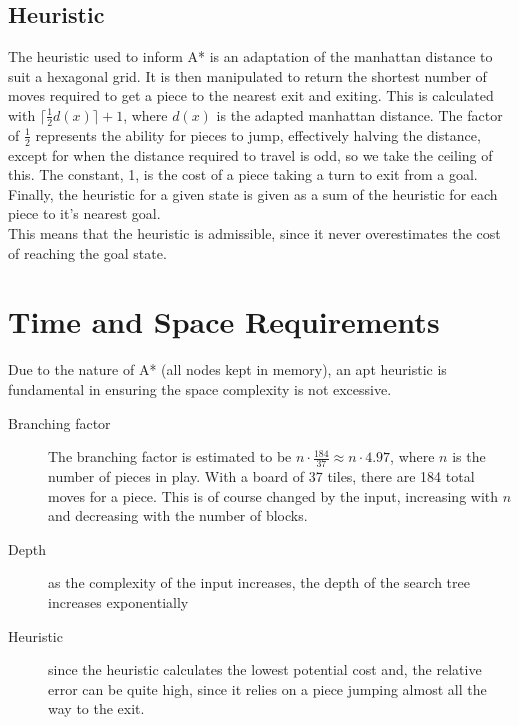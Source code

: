 \documentclass[a4paper,10pt,draft]{article}
\begin{document}
\subsection{Heuristic}
The heuristic used to inform A* is an adaptation of the manhattan distance to suit a hexagonal grid.
It is then manipulated to return the shortest number of moves required to get a piece to the nearest exit and exiting.
This is calculated with $\lceil\frac{1}{2}d(x)\rceil + 1$, where $d(x)$ is the adapted manhattan distance.
The factor of $\frac{1}{2}$ represents the ability for pieces to jump, effectively halving the distance, except for when the distance required to travel is odd, so we take the ceiling of this.
The constant, 1, is the cost of a piece taking a turn to exit from a goal.
Finally, the heuristic for a given state is given as a sum of the heuristic for each piece to it's nearest goal.\\
This means that the heuristic is admissible, since it never overestimates the cost of reaching the goal state.
\\
\section{Time and Space Requirements}
Due to the nature of A* (all nodes kept in memory), an apt heuristic is fundamental in ensuring the space complexity is not excessive. 
\begin{description}
	\item[Branching factor] The branching factor is estimated to be $n\cdot \frac{184}{37} \approx n \cdot 4.97$, where $n$ is the number of pieces in play.
		With a board of 37 tiles, there are 184 total moves for a piece.
		This is of course changed by the input, increasing with $n$ and decreasing with the number of blocks.
	\item[Depth] as the complexity of the input increases, the depth of the search tree increases exponentially
	\item[Heuristic] since the heuristic calculates the lowest potential cost and, the relative error can be quite high, since it relies on a piece jumping almost all the way to the exit. 
\end{description}
\end{document}
